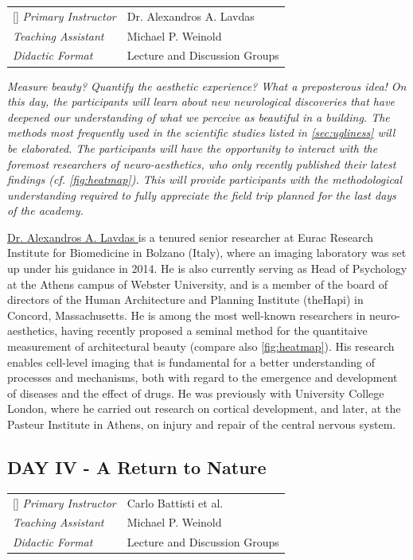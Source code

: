 \documentclass{article}
\begin{document}
\begin{NiceTabular}{W{l}{3cm}l}[]
\textit{Primary Instructor} & Dr. Alexandros A. Lavdas \\
\textit{Teaching Assistant} & Michael P. Weinold \\
\textit{Didactic Format} & Lecture and Discussion Groups
\end{NiceTabular}

\textit{Measure beauty? Quantify the aesthetic experience? What a preposterous idea! On this day, the participants will learn about new neurological discoveries that have deepened our understanding of what we perceive as beautiful in a building. The methods most frequently used in the scientific studies listed in \cref{sec:ugliness} will be elaborated. The participants will have the opportunity to interact with the foremost researchers of neuro-aesthetics, who only recently published their latest findings (cf. \cref{fig:heatmap}). This will provide participants with the methodological understanding required to fully appreciate the field trip planned for the last days of the academy.}

\href{https://www.linkedin.com/in/alexandros-a-lavdas-9b127518/}{Dr. Alexandros A. Lavdas \ExternalLink} is a tenured senior researcher at Eurac Research Institute for Biomedicine in Bolzano (Italy), where an imaging laboratory was set up under his guidance in 2014. He is also currently serving as Head of Psychology at the Athens campus of Webster University, and is a member of the board of directors of the Human Architecture and Planning Institute (theHapi) in Concord, Massachusetts. He is among the most well-known researchers in neuro-aesthetics, having recently proposed a seminal method for the quantitaive measurement of architectural beauty \cite{lavdas_architectural_2022} (compare also \cref{fig:heatmap}). His research enables cell-level imaging that is fundamental for a better understanding of processes and mechanisms, both with regard to the emergence and development of diseases and the effect of drugs. He was previously with University College London, where he carried out research on cortical development, and later, at the Pasteur Institute in Athens, on injury and repair of the central nervous system.

\subsection{DAY IV - A Return to Nature}

\begin{NiceTabular}{W{l}{3cm}l}[]
\textit{Primary Instructor} & Carlo Battisti et al. \\
\textit{Teaching Assistant} & Michael P. Weinold \\
\textit{Didactic Format} & Lecture and Discussion Groups
\end{NiceTabular}
\end{document}
